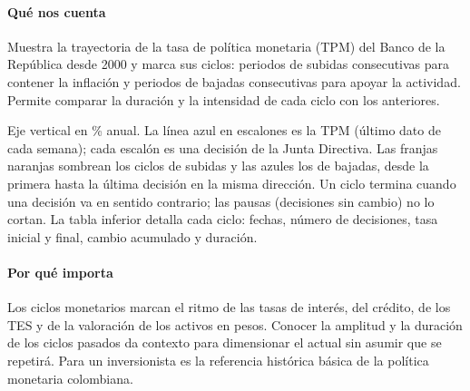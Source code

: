 \paragraph{Qué nos cuenta}
Muestra la trayectoria de la tasa de política monetaria (TPM) del Banco de la República desde 2000 y marca sus ciclos: periodos de subidas consecutivas para contener la inflación y periodos de bajadas consecutivas para apoyar la actividad. Permite comparar la duración y la intensidad de cada ciclo con los anteriores.

\begin{leer}
Eje vertical en \% anual. La línea azul en escalones es la TPM (último dato de cada semana); cada escalón es una decisión de la Junta Directiva. Las franjas naranjas sombrean los ciclos de subidas y las azules los de bajadas, desde la primera hasta la última decisión en la misma dirección. Un ciclo termina cuando una decisión va en sentido contrario; las pausas (decisiones sin cambio) no lo cortan. La tabla inferior detalla cada ciclo: fechas, número de decisiones, tasa inicial y final, cambio acumulado y duración.
\end{leer}

\paragraph{Por qué importa}
Los ciclos monetarios marcan el ritmo de las tasas de interés, del crédito, de los TES y de la valoración de los activos en pesos. Conocer la amplitud y la duración de los ciclos pasados da contexto para dimensionar el actual sin asumir que se repetirá. Para un inversionista es la referencia histórica básica de la política monetaria colombiana.

